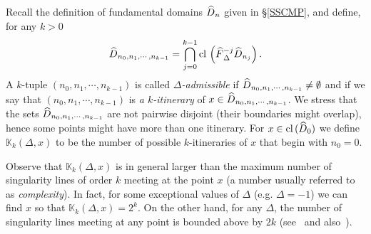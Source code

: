\documentclass[AHL, Unicode, longabstracts,published]{cedram}
\newcommand{\cl}[1]{\mathrm{cl}\,#1}
\newcommand{\LC}{\mathbb{K}}
\newcommand{\hDom}{\hat D}
\newcommand{\nf}{\hat F}
\let\oldhat\hat
\renewcommand*{\hat}[1]{\mathchoice{\widehat{#1}}{\widehat{#1}}{\oldhat{#1}}{\oldhat{#1}}}
\begin{document}
Recall the definition of fundamental domains $\hDom_n$ given in
\S\ref{SSCMP}, and define, for any $k > 0$
\begin{equation}\label{DefItin}
\hDom_{n_0,n_1,\cdots,n_{k-1}} = \bigcap_{j = 0}^{k-1}\cl\left(\nf^{-j}_{\Delta}\hDom_{n_j}\right).
\end{equation}
A $k$-tuple $(n_0,n_1,\cdots,n_{k-1})$ is called
\emph{$\Delta$-admissible} if $\hDom_{n_0,n_1,\cdots,n_{k-1}}\ne\emptyset$ and if we say that $(n_0,n_1,\cdots,n_{k-1})$ is \emph{a $k$-itinerary} of $x\in\hDom_{n_0,n_1,\cdots,n_{k-1}}$. We stress that the sets $\hDom_{n_0,n_1,\cdots,n_{k-1}}$ are not pairwise disjoint (their boundaries might overlap), hence some points might have more than one itinerary. For $x\in \cl(\hDom_0)$ we define $ \LC_k(\Delta,x)$ to be the number of possible $k$-itineraries of $x$ that begin with $n_0=0$.
\begin{rema}
Observe that $\LC_k(\Delta,x)$ is in general larger than the maximum number of singularity lines of order $k$ meeting at the point $x$ (a number usually referred to as \emph{complexity}). In fact, for some exceptional values of $\Delta$ (e.g. $\Delta = -1$) we can find $x$ so that $\LC_k(\Delta,x) = 2^k$. On the other hand, for any $\Delta$, the number of singularity lines meeting at any point is bounded above by $2k$ (see~\cite[Proof of Theorem~2]{fum} and also~\cite{C3}).
\end{rema}
\end{document}
